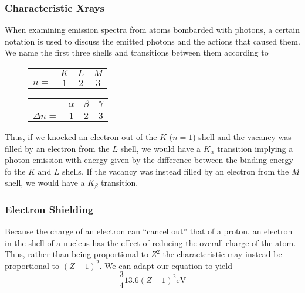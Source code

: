 \documentclass[12pt]{report}
\begin{document}
\begin{flushleft}
\subsubsection*{Characteristic Xrays}

When examining emission spectra from atoms bombarded with photons, a certain
notation is used to discuss the emitted photons and the actions that caused
them. We name the first three shells and transitions between them according to

\begin{figure}[!htb]
    \hspace{0.05\textwidth}
    \begin{minipage}{0.4\textwidth}
        \centering
        \begin{tabular}{c|c|c|c|}
            & \(K\) & \(L\) & \(M\) \\
            \(n = \) & \(1\) & \(2\) & \(3\) \\
        \end{tabular}
    \end{minipage}
    \begin{minipage}{0.4\textwidth}
        \centering
        \begin{tabular}{c|c|c|c|}
            & \(\alpha\) & \(\beta\) & \(\gamma\) \\
            \(\Delta n =\) & \(1\) & \(2\) & \(3\) \\
        \end{tabular}
    \end{minipage}
\end{figure}

Thus, if we knocked an electron out of the \(K\) (\(n = 1\)) shell and the
vacancy was filled by an electron from the \(L\) shell, we would have a
\(K_\alpha\) transition implying a photon emission with energy given by the
difference between the binding energy fo the \(K\) and \(L\) shells. If the
vacancy was instead filled by an electron from the \(M\) shell, we would have
a \(K_\beta\) transition.

\subsubsection*{Electron Shielding}

Because the charge of an electron can ``cancel out'' that of a proton, an
electron in the shell of a nucleus has the effect of reducing the overall
charge of the atom. Thus, rather than being proportional to \(Z^2\) the
characteristic may instead be proportional to \((Z - 1)^2\). We can adapt
our equation to yield
\[\frac{3}{4}13.6(Z - 1)^2\mathrm{eV}\]


\end{flushleft}
\end{document}
